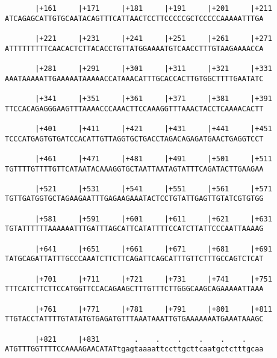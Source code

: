 \documentclass{article}
\begin{document}
\begin{Verbatim}
       |+161     |+171     |+181     |+191     |+201     |+211
ATCAGAGCATTGTGCAATACAGTTTCATTAACTCCTTCCCCCGCTCCCCCAAAAATTTGA
                                                            
       |+221     |+231     |+241     |+251     |+261     |+271
ATTTTTTTTTCAACACTCTTACACCTGTTATGGAAAATGTCAACCTTTGTAAGAAAACCA
                                                            
       |+281     |+291     |+301     |+311     |+321     |+331
AAATAAAAATTGAAAAATAAAAACCATAAACATTTGCACCACTTGTGGCTTTTGAATATC
                                                            
       |+341     |+351     |+361     |+371     |+381     |+391
TTCCACAGAGGGAAGTTTAAAACCCAAACTTCCAAAGGTTTAAACTACCTCAAAACACTT
                                                            
       |+401     |+411     |+421     |+431     |+441     |+451
TCCCATGAGTGTGATCCACATTGTTAGGTGCTGACCTAGACAGAGATGAACTGAGGTCCT
                                                            
       |+461     |+471     |+481     |+491     |+501     |+511
TGTTTTGTTTTGTTCATAATACAAAGGTGCTAATTAATAGTATTTCAGATACTTGAAGAA
                                                            
       |+521     |+531     |+541     |+551     |+561     |+571
TGTTGATGGTGCTAGAAGAATTTGAGAAGAAATACTCCTGTATTGAGTTGTATCGTGTGG
                                                            
       |+581     |+591     |+601     |+611     |+621     |+631
TGTATTTTTTAAAAAATTTGATTTAGCATTCATATTTTCCATCTTATTCCCAATTAAAAG
                                                            
       |+641     |+651     |+661     |+671     |+681     |+691
TATGCAGATTATTTGCCCAAATCTTCTTCAGATTCAGCATTTGTTCTTTGCCAGTCTCAT
                                                            
       |+701     |+711     |+721     |+731     |+741     |+751
TTTCATCTTCTTCCATGGTTCCACAGAAGCTTTGTTTCTTGGGCAAGCAGAAAAATTAAA
                                                            
       |+761     |+771     |+781     |+791     |+801     |+811
TTGTACCTATTTTGTATATGTGAGATGTTTAAATAAATTGTGAAAAAAATGAAATAAAGC
                                                            
       |+821     |+831        .    .    .    .    .    .    
ATGTTTGGTTTTCCAAAAGAACATATtgagtaaaattccttgcttcaatgctctttgcaa
                                                            

\end{Verbatim}
\end{document}
